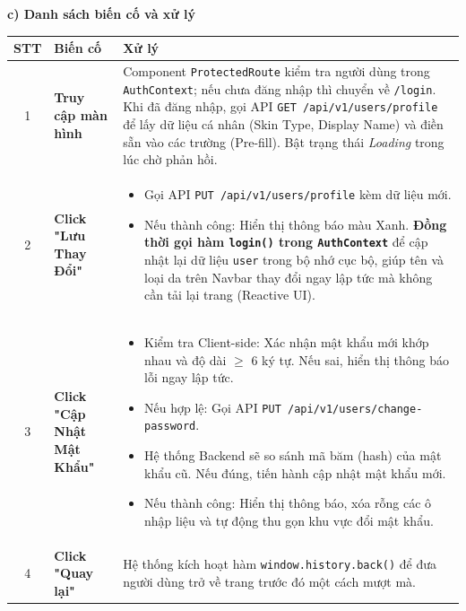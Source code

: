 \documentclass[12pt,a4paper]{article}
\begin{document}
\textbf{c) Danh sách biến cố và xử lý}

\begin{center}
\renewcommand{\arraystretch}{1.5}
\begin{tabularx}{\textwidth}{|c|l|X|}
\hline
\rowcolor{blue!20}
\textbf{STT} & \textbf{Biến cố} & \textbf{Xử lý} \\ \hline

1 & \textbf{Truy cập màn hình} & Component \texttt{ProtectedRoute} kiểm tra người dùng trong \texttt{AuthContext}; nếu chưa đăng nhập thì chuyển về \texttt{/login}. Khi đã đăng nhập, gọi API \texttt{GET /api/v1/users/profile} để lấy dữ liệu cá nhân (Skin Type, Display Name) và điền sẵn vào các trường (Pre-fill). Bật trạng thái \textit{Loading} trong lúc chờ phản hồi. \\ \hline

2 & \textbf{Click "Lưu Thay Đổi"} & 
\begin{itemize}
    \item Gọi API \texttt{PUT /api/v1/users/profile} kèm dữ liệu mới.
    \item Nếu thành công: Hiển thị thông báo màu Xanh. \textbf{Đồng thời gọi hàm \texttt{login()} trong \texttt{AuthContext}} để cập nhật lại dữ liệu \texttt{user} trong bộ nhớ cục bộ, giúp tên và loại da trên Navbar thay đổi ngay lập tức mà không cần tải lại trang (Reactive UI).
\end{itemize} \\ \hline

3 & \textbf{Click "Cập Nhật Mật Khẩu"} & 
\begin{itemize}
    \item Kiểm tra Client-side: Xác nhận mật khẩu mới khớp nhau và độ dài $\ge$ 6 ký tự. Nếu sai, hiển thị thông báo lỗi ngay lập tức.
    \item Nếu hợp lệ: Gọi API \texttt{PUT /api/v1/users/change-password}.
    \item Hệ thống Backend sẽ so sánh mã băm (hash) của mật khẩu cũ. Nếu đúng, tiến hành cập nhật mật khẩu mới.
    \item Nếu thành công: Hiển thị thông báo, xóa rỗng các ô nhập liệu và tự động thu gọn khu vực đổi mật khẩu.
\end{itemize} \\ \hline

4 & \textbf{Click "Quay lại"} & Hệ thống kích hoạt hàm \texttt{window.history.back()} để đưa người dùng trở về trang trước đó một cách mượt mà. \\ \hline

\end{tabularx}
\end{center}
\end{document}
